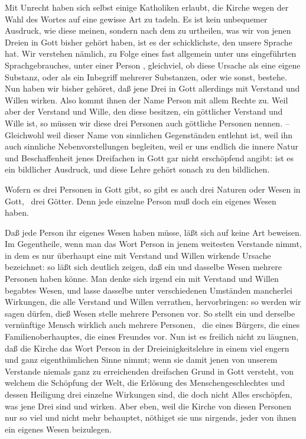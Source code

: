 Mit Unrecht haben sich selbst einige Katholiken erlaubt, die Kirche wegen der Wahl des Wortes  auf eine gewisse Art zu tadeln. Es ist kein unbequemer Ausdruck, wie diese meinen, sondern nach dem zu urtheilen, was wir von jenen Dreien in Gott bisher gehört haben, ist es der schicklichste, den unsere Sprache hat. Wir verstehen nämlich, zu Folge eines fast allgemein unter uns eingeführten Sprachgebrauches, unter einer Person , gleichviel, ob diese Ursache als eine eigene Substanz, oder als ein Inbegriff mehrerer Substanzen, oder wie sonst, bestehe. Nun haben wir bisher gehöret, daß jene Drei in Gott allerdings mit Verstand und Willen wirken. Also kommt ihnen der Name Person mit allem Rechte zu. Weil aber der Verstand und Wille, den diese besitzen, ein göttlicher Verstand und Wille ist, so müssen wir diese drei Personen auch göttliche Personen nennen. -- Gleichwohl weil dieser Name von sinnlichen Gegenständen entlehnt ist, weil ihn auch sinnliche Nebenvorstellungen begleiten, weil er uns endlich die innere Natur und Beschaffenheit jenes Dreifachen in Gott gar nicht erschöpfend angibt: ist es ein bildlicher Ausdruck, und diese Lehre gehört sonach zu den bildlichen.\par
{} Wofern es drei Personen in Gott gibt, so gibt es auch drei Naturen oder Wesen in Gott, \dh\ drei Götter. Denn jede einzelne Person muß doch ein eigenes Wesen haben.\par
{} Daß jede Person ihr eigenes Wesen haben müsse, läßt sich auf keine Art beweisen. Im Gegentheile, wenn man das Wort Person in jenem weitesten Verstande nimmt, in dem es nur überhaupt eine mit Verstand und Willen wirkende Ursache bezeichnet: so läßt sich deutlich zeigen, daß ein und dasselbe Wesen mehrere Personen haben könne. Man denke sich irgend ein mit Verstand und Willen begabtes Wesen, und lasse dasselbe unter verschiedenen Umständen mancherlei Wirkungen, die alle Verstand und Willen verrathen, hervorbringen: so werden wir sagen dürfen, dieß Wesen stelle mehrere Personen vor. So stellt ein und derselbe vernünftige Mensch wirklich auch mehrere Personen, \zB\ die eines Bürgers, die eines Familienoberhauptes, die eines Freundes vor. Nun ist es freilich nicht zu läugnen, daß die Kirche das Wort Person in der Dreieinigkeitslehre in einem viel engern und ganz eigenthümlichen Sinne nimmt; wenn sie damit jenen von unserem Verstande niemals ganz zu erreichenden dreifachen Grund in Gott versteht, von welchem die Schöpfung der Welt, die Erlösung des Menschengeschlechtes und dessen Heiligung drei einzelne Wirkungen sind, die doch nicht Alles erschöpfen, was jene Drei sind und wirken. Aber eben, weil die Kirche von diesen Personen nur so viel und nicht mehr behauptet, nöthiget sie uns nirgends, jeder von ihnen ein eigenes Wesen beizulegen.

